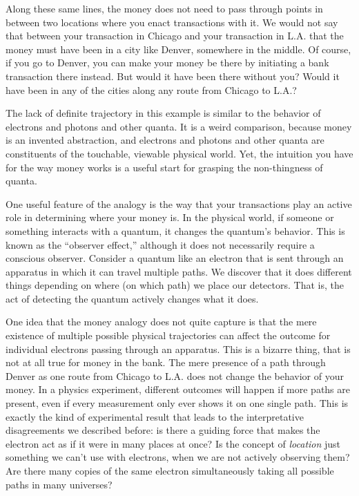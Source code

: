 \documentclass[onecolumn,preprintnumbers,amsmath,amssymbn,reprint,nofootinbib,superscriptaddress]{revtex4}    %
\begin{document}
Along these same lines, the money does not need to pass through points in between two locations where you enact transactions with it.  We would not say that between your transaction in Chicago and your transaction in L.A. that the money must have been in a city like Denver, somewhere in the middle.  Of course, if you go to Denver, you can make your money be there by initiating a bank transaction there instead.  But would it have been there without you?  Would it have been in any of the cities along any route from Chicago to L.A.?

The lack of definite trajectory in this example is similar to the behavior of electrons and photons and other quanta.  It is a weird comparison, because money is an invented abstraction, and electrons and photons and other quanta are constituents of the touchable, viewable physical world.  Yet, the intuition you have for the way money works is a useful start for grasping the non-thingness of quanta.

One useful feature of the analogy is the way that your transactions play an active role in determining where your money is.  In the physical world, if someone or something interacts with a quantum, it changes the quantum's behavior. This is known as the ``observer effect,'' although it does not necessarily require a conscious observer.  Consider a quantum like an electron that is sent through an apparatus in which it can travel multiple paths.  We discover that it does different things depending on where (on which path) we place our detectors.  That is, the act of detecting the quantum actively changes what it does.

One idea that the money analogy does not quite capture is that the mere existence of multiple possible physical trajectories can affect the outcome for individual electrons passing through an apparatus.  This is a bizarre thing, that is not at all true for money in the bank.  The mere presence of a path through Denver as one route from Chicago to L.A. does not change the behavior of your money.  In a physics experiment, different outcomes will happen if more paths are present, even if every measurement only ever shows it on one single path.  This is exactly the kind of experimental result that leads to the interpretative disagreements we described before:  is there a guiding force that makes the electron act as if it were in many places at once?  Is the concept of {\em location} just something we can't use with electrons, when we are not actively observing them?  Are there many copies of the same electron simultaneously taking all possible paths in many universes?  
\end{document}
